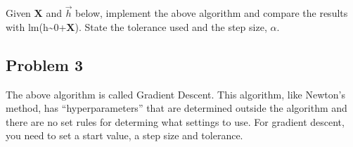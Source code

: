 \documentclass[]{article}
\newenvironment{Shaded}{\begin{snugshade}}{\end{snugshade}}
\newcommand{\DataTypeTok}[1]{\textcolor[rgb]{0.13,0.29,0.53}{#1}}
\newcommand{\DecValTok}[1]{\textcolor[rgb]{0.00,0.00,0.81}{#1}}
\newcommand{\FloatTok}[1]{\textcolor[rgb]{0.00,0.00,0.81}{#1}}
\newcommand{\KeywordTok}[1]{\textcolor[rgb]{0.13,0.29,0.53}{\textbf{#1}}}
\newcommand{\NormalTok}[1]{#1}
\newcommand{\OperatorTok}[1]{\textcolor[rgb]{0.81,0.36,0.00}{\textbf{#1}}}
\newcommand{\StringTok}[1]{\textcolor[rgb]{0.31,0.60,0.02}{#1}}
\begin{document}
Given \(\mathbf{X}\) and \(\vec{h}\) below, implement the above
algorithm and compare the results with
lm(h\textasciitilde{}0+\(\mathbf{X}\)). State the tolerance used and the
step size, \(\alpha\).

\begin{Shaded}
\end{Shaded}

\hypertarget{problem-3}{%
\subsection{Problem 3}\label{problem-3}}

The above algorithm is called Gradient Descent. This algorithm, like
Newton's method, has ``hyperparameters'' that are determined outside the
algorithm and there are no set rules for determing what settings to use.
For gradient descent, you need to set a start value, a step size and
tolerance.
\end{document}
